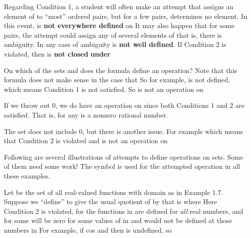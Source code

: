 \documentclass[11pt,oneside]{article}
\begin{document}
\begin{BookBody}
\noindent Regarding Condition 1, a student will often make an attempt that assigns an element of  to “most” ordered pairs, but for a few pairs, determines no element. In this event, \BookInline{\ast } is\textbf{ not everywhere defined} on  It may also happen that for some pairs, the attempt could assign any of several elements of  that is, there is ambiguity. In any case of ambiguity\BookInline{,\allowbreak \ast } is\textbf{ not well defined}. If Condition 2 is violated, then  is\textbf{ not closed} \textbf{under} 

 On which of the sets  and  does the formula  define an operation? Note that this formula does not make sense in the case that  So for example,  is not defined, which means Condition 1 is not satisfied. So \BookInline{\ast } is not an operation on 

If we throw out 0, we do have an operation on  since both Conditions 1 and 2 are satisfied. That is, for any  is a nonzero rational number.

The set  does not include 0, but there is another issue. For example  which means that Condition 2 is violated and \BookInline{\ast } is not an operation on \BookEnd{\blacktriangle}

Following are several illustrations of attempts to define operations on sets. Some of them need some work! The symbol \BookInline{\ast } is used for the attempted operation in all these examples.

 Let  be the set of all real-valued functions with domain  as in Example 1.7. Suppose we “define” \BookInline{\ast } to give the usual quotient of  by  that is where   Here Condition 2 is violated, for the functions in  are defined for\textit{ all} real numbers, and for some  will be zero for some values of  in  and  would not be defined at those numbers in  For example, if  cos  and  then  is undefined, so \BookEnd{\blacktriangle}


\end{BookBody}
\end{document}

